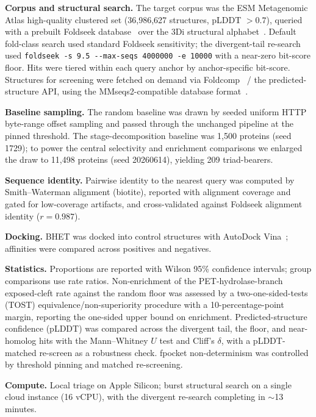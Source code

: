 \documentclass[10pt]{article}
\newcommand{\sm}{\ensuremath{\sim}}
\begin{document}
\noindent\textbf{Corpus and structural search.} The target corpus was the ESM Metagenomic Atlas high-quality clustered set (36,986,627 structures, pLDDT $> 0.7$), queried with a prebuilt Foldseek database~\cite{vankempen2024} over the 3Di structural alphabet~\cite{heinzinger2024}. Default fold-class search used standard Foldseek sensitivity; the divergent-tail re-search used \texttt{foldseek -s 9.5 -{}-max-seqs 4000000 -e 10000} with a near-zero bit-score floor. Hits were tiered within each query anchor by anchor-specific bit-score. Structures for screening were fetched on demand via Foldcomp~\cite{kim2023} / the predicted-structure API, using the MMseqs2-compatible database format~\cite{steinegger2017}.

\noindent\textbf{Baseline sampling.} The random baseline was drawn by seeded uniform HTTP byte-range offset sampling and passed through the unchanged pipeline at the pinned threshold. The stage-decomposition baseline was 1,500 proteins (seed 1729); to power the central selectivity and enrichment comparisons we enlarged the draw to 11,498 proteins (seed 20260614), yielding 209 triad-bearers.

\noindent\textbf{Sequence identity.} Pairwise identity to the nearest query was computed by Smith--Waterman alignment (biotite), reported with alignment coverage and gated for low-coverage artifacts, and cross-validated against Foldseek alignment identity ($r = 0.987$).

\noindent\textbf{Docking.} BHET was docked into control structures with AutoDock Vina~\cite{trott2010,eberhardt2021}; affinities were compared across positives and negatives.

\noindent\textbf{Statistics.} Proportions are reported with Wilson 95\% confidence intervals; group comparisons use rate ratios. Non-enrichment of the PET-hydrolase-branch exposed-cleft rate against the random floor was assessed by a two-one-sided-tests (TOST) equivalence/non-superiority procedure with a 10-percentage-point margin, reporting the one-sided upper bound on enrichment. Predicted-structure confidence (pLDDT) was compared across the divergent tail, the floor, and near-homolog hits with the Mann--Whitney $U$ test and Cliff's $\delta$, with a pLDDT-matched re-screen as a robustness check. fpocket non-determinism was controlled by threshold pinning and matched re-screening.

\noindent\textbf{Compute.} Local triage on Apple Silicon; burst structural search on a single cloud instance (16 vCPU), with the divergent re-search completing in \sm13 minutes.
\end{document}
